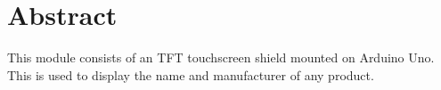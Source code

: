\documentclass[
12pt, %
a4paper, %
oneside, %
headinclude,footinclude, %
BCOR5mm, %
]{scrartcl}
\title{\normalfont\spacedallcaps{MMI Display Interface Panel}} %
\subtitle{11-01-001-6} %
\date{} %
\begin{document}

\renewcommand{\sectionmark}[1]{\markright{\spacedlowsmallcaps{#1}}} %
\lehead{\mbox{\llap{\small\thepage\kern1em\color{halfgray} \vline}\color{halfgray}\hspace{0.5em}\rightmark\hfil}} %

\pagestyle{scrheadings} %


\maketitle %

\setcounter{tocdepth}{5} %

\tableofcontents %




\section*{Abstract} %


This module consists of an TFT touchscreen shield mounted on Arduino Uno. This is used to display the name and manufacturer of any product.
\end{document}
